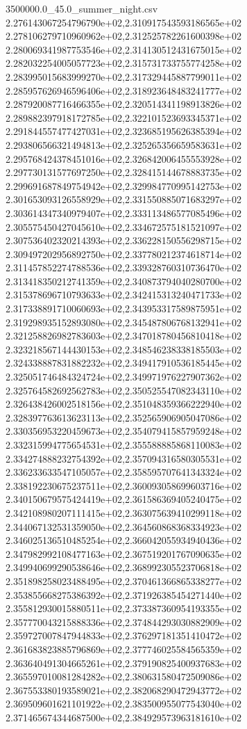 \begin{filecontents*}{3500000.0_45.0_summer_night.csv}
2.276143067254796790e+02,2.310917543593186565e+02
2.278106279710960962e+02,2.312525782261600398e+02
2.280069341987753546e+02,2.314130512431675015e+02
2.282032254005057723e+02,2.315731733755774258e+02
2.283995015683999270e+02,2.317329445887799011e+02
2.285957626946596406e+02,2.318923648483241777e+02
2.287920087716466355e+02,2.320514341198913826e+02
2.289882397918172785e+02,2.322101523693345371e+02
2.291844557477427031e+02,2.323685195626385394e+02
2.293806566321494813e+02,2.325265356659583631e+02
2.295768424378451016e+02,2.326842006455553928e+02
2.297730131577697250e+02,2.328415144678883735e+02
2.299691687849754942e+02,2.329984770995142753e+02
2.301653093126558929e+02,2.331550885071683297e+02
2.303614347340979407e+02,2.333113486577085496e+02
2.305575450427045610e+02,2.334672575181521097e+02
2.307536402320214393e+02,2.336228150556298715e+02
2.309497202956892750e+02,2.337780212374618714e+02
2.311457852274788536e+02,2.339328760310736470e+02
2.313418350212741359e+02,2.340873794040280700e+02
2.315378696710793633e+02,2.342415313240471733e+02
2.317338891710060693e+02,2.343953317589875951e+02
2.319298935152893080e+02,2.345487806768132941e+02
2.321258826982783603e+02,2.347018780456810418e+02
2.323218567144430153e+02,2.348546238338185503e+02
2.324338887831882232e+02,2.349417910536185445e+02
2.325051746484324724e+02,2.349971976227907362e+02
2.325764582692562783e+02,2.350525547082343110e+02
2.326438426002518156e+02,2.351048359366222940e+02
2.328397763613623113e+02,2.352565906905047086e+02
2.330356953220459673e+02,2.354079415857959248e+02
2.332315994775654531e+02,2.355588885868110083e+02
2.334274888232754392e+02,2.357094316580305531e+02
2.336233633547105057e+02,2.358595707641343324e+02
2.338192230675237511e+02,2.360093058699603716e+02
2.340150679575424419e+02,2.361586369405240475e+02
2.342108980207111415e+02,2.363075639410299118e+02
2.344067132531359050e+02,2.364560868368334923e+02
2.346025136510485254e+02,2.366042055934940436e+02
2.347982992108477163e+02,2.367519201767090635e+02
2.349940699290538646e+02,2.368992305523706818e+02
2.351898258023488495e+02,2.370461366865338277e+02
2.353855668275386392e+02,2.371926385454271440e+02
2.355812930015880511e+02,2.373387360954193355e+02
2.357770043215888336e+02,2.374844293030882909e+02
2.359727007847944833e+02,2.376297181351410472e+02
2.361683823885796869e+02,2.377746025584565359e+02
2.363640491304665261e+02,2.379190825400937683e+02
2.365597010081284282e+02,2.380631580472509086e+02
2.367553380193589021e+02,2.382068290472943772e+02
2.369509601621101922e+02,2.383500955077543040e+02
2.371465674344687500e+02,2.384929573963181610e+02

\end{filecontents*}
